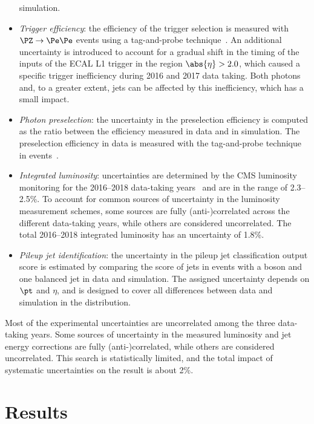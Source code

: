 \documentclass[11pt,twoside,a4paper,cmspaper,final,collab]{cms-tdr}
\begin{document}
\begin{itemize}
simulation.
\item \textit{Trigger efficiency}: 
  the efficiency of the trigger selection is measured with 
  $\Zee$ events using a tag-and-probe technique~\cite{CMS:2011aa}. An additional uncertainty is introduced to account for a 
  gradual shift in the timing of the inputs of the ECAL L1 trigger in the region $\abs{\eta} > 2.0$, 
  which caused a specific trigger inefficiency during 2016 and 2017 data taking. 
  Both photons and, to a greater extent, jets can be affected by this inefficiency, which has a small impact. 
\item \textit{Photon preselection}: 
  the uncertainty in the preselection efficiency
  is computed as the ratio between the efficiency measured in data and in simulation. The preselection efficiency in data is measured with the tag-and-probe technique in \Zee events~\cite{CMS:2011aa}.
\item \textit{Integrated luminosity}: 
  uncertainties are determined by the CMS luminosity monitoring 
  for the 2016--2018 data-taking years~\cite{CMSlumi2016,CMSlumi2017,CMSlumi2018} and are in the range of 2.3--2.5\%. To account for common sources of uncertainty in the luminosity measurement schemes, some sources are fully (anti-)correlated across the different data-taking years, while others are considered uncorrelated. The total 2016--2018 integrated luminosity has an uncertainty of 1.8\%.
\item \textit{Pileup jet identification}: 
  the uncertainty in the pileup jet classification output score is estimated by
  comparing the score of jets in events with a \PZ boson and one balanced jet
  in data and simulation. The assigned uncertainty depends on $\pt$ and $\eta$, and is designed to cover all differences between data and simulation in the distribution.
\end{itemize}

Most of the experimental uncertainties are uncorrelated among the three data-taking years. Some sources of uncertainty in the measured luminosity and jet energy corrections are fully (anti-)correlated, while others are considered uncorrelated.
This search is statistically limited, and the total impact of systematic uncertainties on the result is about 2\%. 



\section{Results}
\label{sec:res}
\end{document}
